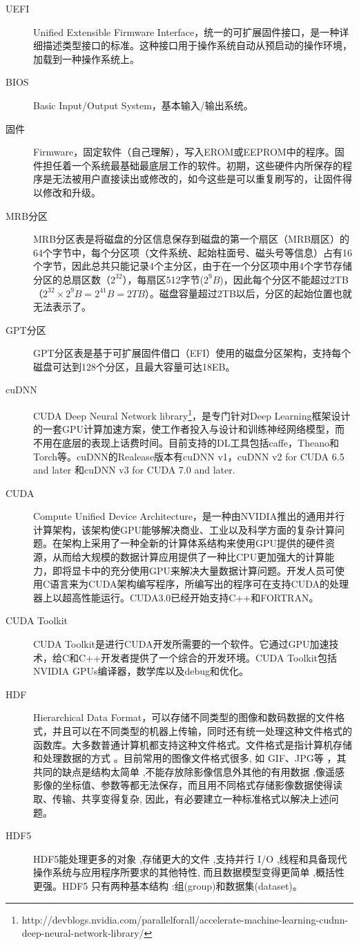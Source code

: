 \begin{description}
\item[UEFI] Unified Extensible Firmware Interface，统一的可扩展固件接口，是一种详细描述类型接口的标准。这种接口用于操作系统自动从预启动的操作环境，加载到一种操作系统上。
\item[BIOS] Basic Input/Output System，基本输入/输出系统。
\item[固件] Firmware，固定软件（自己理解），写入EROM或EEPROM中的程序。固件担任着一个系统最基础最底层工作的软件。初期，这些硬件内所保存的程序是无法被用户直接读出或修改的，如今这些是可以重复刷写的，让固件得以修改和升级。
\item[MRB分区] MRB分区表是将磁盘的分区信息保存到磁盘的第一个扇区（MRB扇区）的64个字节中，每个分区项（文件系统、起始柱面号、磁头号等信息）占有16个字节，因此总共只能记录4个主分区，由于在一个分区项中用4个字节存储分区的总扇区数（$2^{32}$），每扇区512字节($2^{9}B$)，因此每个分区不能超过2TB（$2^{32} \times 2^{9}B=2^{41}B=2TB$）。磁盘容量超过2TB以后，分区的起始位置也就无法表示了。
\item[GPT分区] GPT分区表是基于可扩展固件借口（EFI）使用的磁盘分区架构，支持每个磁盘可达到128个分区，且最大容量可达18EB。
\item[cuDNN] CUDA Deep Neural Network library\footnote{http://devblogs.nvidia.com/parallelforall/accelerate-machine-learning-cudnn-deep-neural-network-library/}，是专门针对Deep Learning框架设计的一套GPU计算加速方案，使工作者投入与设计和训练神经网络模型，而不用在底层的表现上话费时间。目前支持的DL工具包括caffe，Theano和Torch等。cuDNN的Realease版本有cuDNN v1，cuDNN v2 for CUDA 6.5 and later 和cuDNN v3 for CUDA 7.0 and later.
\item[CUDA] Compute Unified Device Architecture，是一种由NVIDIA推出的通用并行计算架构，该架构使GPU能够解决商业、工业以及科学方面的复杂计算问题。在架构上采用了一种全新的计算体系结构来使用GPU提供的硬件资源，从而给大规模的数据计算应用提供了一种比CPU更加强大的计算能力，即将显卡中的充分使用GPU来解决大量数据计算问题。开发人员可使用C语言来为CUDA架构编写程序，所编写出的程序可在支持CUDA的处理器上以超高性能运行。CUDA3.0已经开始支持C++和FORTRAN。
\item[CUDA Toolkit] CUDA Toolkit是进行CUDA开发所需要的一个软件。它通过GPU加速技术，给C和C++开发者提供了一个综合的开发环境。CUDA Toolkit包括NVIDIA GPUs编译器，数学库以及debug和优化。
\item[HDF] Hierarchical Data Format，可以存储不同类型的图像和数码数据的文件格式，并且可以在不同类型的机器上传输，同时还有统一处理这种文件格式的函数库。大多数普通计算机都支持这种文件格式。文件格式是指计算机存储和处理数据的方式 。目前常用的图像文件格式很多, 如 GIF、JPG等 ，其共同的缺点是结构太简单 ,不能存放除影像信息外其他的有用数据 ,像遥感影像的坐标值、参数等都无法保存，而且用不同格式存储影像数据使得读取、传输、共享变得复杂, 因此，有必要建立一种标准格式以解决上述问题。
\item[HDF5] HDF5能处理更多的对象 ,存储更大的文件 ,支持并行 I/O ,线程和具备现代操作系统与应用程序所要求的其他特性, 而且数据模型变得更简单 ,概括性更强。HDF5 只有两种基本结构 :组(group)和数据集(dataset)。
\end{description}



